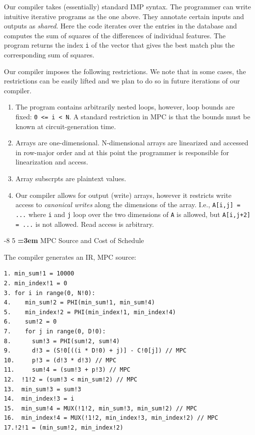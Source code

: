 \documentclass[sigconf, screen, natbib=false, dvipsnames, table]{acmart}
\makeatletter
\renewcommand{\subsection}{\@startsection{subsection}{2}{\z@}%
                        {-8\p@ \@plus -4\p@ \@minus -4\p@}%
                        {5\p@ \@plus 2\p@ \@minus 2\p@}%
                        {\normalfont\Large\bfseries\boldmath
                         \rightskip=\z@ \@plus 3em\pretolerance=10000 }}
\theoremstyle{definition}
\makeatother
\begin{document}
Our compiler takes (essentially) standard IMP syntax.
The programmer can write intuitive iterative programs as the one above.
They annotate certain inputs and outputs as \emph{shared}.
Here the code iterates over the entries in the database and computes
the sum of squares of the differences of individual features. The program returns the 
index \texttt{i} of the vector that gives the best match plus the corresponding sum of squares.


Our compiler imposes the following restrictions. We note that in some cases, the restrictions 
can be easily lifted and we plan to do so in future iterations of our compiler. 

\begin{enumerate}
\item The program contains arbitrarily nested loops, however, loop bounds are fixed: \texttt{0 <= i < N}.
A standard restriction in MPC is that the bounds must be known at circuit-generation time.
\item Arrays are one-dimensional. N-dimensional arrays are linearized and accessed 
in row-major order and at this point the programmer is responsible for linearization
and access. 
\item Array subscrpts are plaintext values.
\item Our compiler allows for output (write) arrays, however it restricts
write access to \emph{canonical writes} along the dimensions of the array. I.e., \texttt{A[i,j] = ...}
where \texttt{i} and \texttt{j} loop over the two dimensions of \texttt{A} is allowed, 
but \texttt{A[i,j+2] = ...} is not allowed. Read access is arbitrary. 
\end{enumerate}

\subsection{MPC Source and Cost of Schedule}

The compiler generates an IR, MPC source:
{\small
\begin{verbatim}
1. min_sum!1 = 10000
2. min_index!1 = 0
3. for i in range(0, N!0):
4.    min_sum!2 = PHI(min_sum!1, min_sum!4)
5.    min_index!2 = PHI(min_index!1, min_index!4)
6.    sum!2 = 0
7.    for j in range(0, D!0):
8.      sum!3 = PHI(sum!2, sum!4)
9.      d!3 = (S!0[((i * D!0) + j)] - C!0[j]) // MPC
10.     p!3 = (d!3 * d!3) // MPC
11.     sum!4 = (sum!3 + p!3) // MPC
12.  !1!2 = (sum!3 < min_sum!2) // MPC
13.  min_sum!3 = sum!3
14.  min_index!3 = i
15.  min_sum!4 = MUX(!1!2, min_sum!3, min_sum!2) // MPC
16.  min_index!4 = MUX(!1!2, min_index!3, min_index!2) // MPC
17.!2!1 = (min_sum!2, min_index!2)   
\end{verbatim}
}
\end{document}

